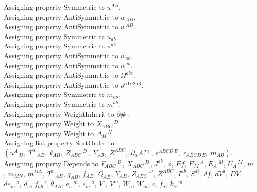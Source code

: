 \documentclass[11pt]{article}
\begin{document}
Assigning property Symmetric to ${u}^{A B}$.
\\
Assigning property AntiSymmetric to ${w}_{A B}$.
\\
Assigning property AntiSymmetric to ${w}^{A B}$.
\\
Assigning property Symmetric to ${u}_{a b}$.
\\
Assigning property Symmetric to ${u}^{a b}$.
\\
Assigning property AntiSymmetric to ${w}_{a b}$.
\\
Assigning property AntiSymmetric to ${w}^{a b}$.
\\
Assigning property AntiSymmetric to ${\Omega}^{a b c}$.
\\
Assigning property AntiSymmetric to ${\rho}^{\alpha1 \alpha2 \alpha3}$.
\\
Assigning property Symmetric to ${m}_{a b}$.
\\
Assigning property Symmetric to ${m}^{a b}$.
\\
Assigning property WeightInherit to $\partial{\#}\, $.
\\
Assigning property Weight to ${X}_{A B C}\,^{D\, }$.
\\
Assigning property Weight to ${\Delta}_{M}\,^{N}$.
\\
Assigning list property SortOrder to $({u}^{A}\,_{B},\; {T}^{\alpha}\,_{A B},\; {\theta}_{A B},\; {Z}_{A B C}\,^{D\, },\; {Y}_{A B},\; {Z}^{A B C},\; {\partial}_{\alpha}{A??}\, ,\; {\epsilon}^{A B C D\,  E},\; {\epsilon}_{A B C D\,  E},\; {m}_{A B})$.
\\
Assigning property Depends to ${F}_{A B C}\,^{D\, }$, ${X}_{A B C}\,^{D\, }$, ${J}^{a b}$, $\phi$, $Ef$, ${E}_{M}\,^{A}$, ${E}_{A}\,^{M}$, ${U}_{A}\,^{M}$, $m$, ${m}_{M N}$, ${m}^{M N}$, ${T}^{\alpha}\,_{A B}$, ${q}_{A B}$, ${f}_{A B}$, ${Q}_{A B}$, ${Y}_{A B}$, ${Z}_{A B C}\,^{D\, }$, ${Z}^{A B C}$, ${I}^{a b}$, ${S}^{a b}$, $df$, ${dV}^{a}$, $DV$, ${de}_{m}\,^{a}$, ${d}_{a}$, ${f}_{a b}\,^{c}$, ${\theta}_{A B}$, ${e}_{a}\,^{m}$, ${e}_{m}\,^{a}$, ${V}^{a}$, ${V}^{m}$, ${W}_{a}$, ${W}_{m}$, $e$, ${f}_{a}$, ${k}_{\alpha}\,^{m}$.
\end{document}
